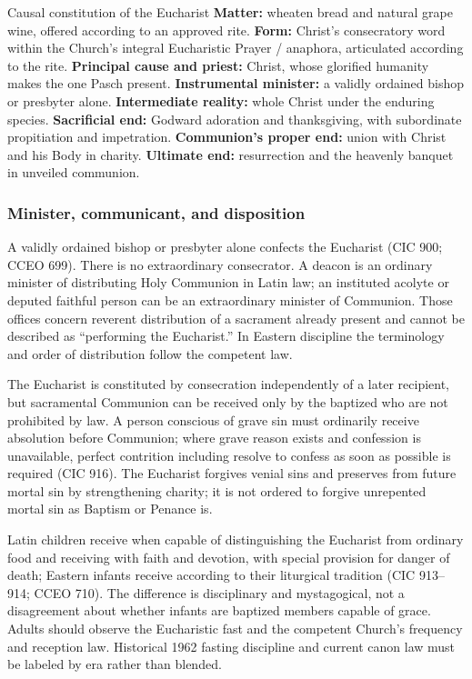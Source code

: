 \begin{massbox}{Causal constitution of the Eucharist}
\textbf{Matter:} wheaten bread and natural grape wine, offered according to an approved rite. \textbf{Form:} Christ's consecratory word within the Church's integral Eucharistic Prayer / anaphora, articulated according to the rite. \textbf{Principal cause and priest:} Christ, whose glorified humanity makes the one Pasch present. \textbf{Instrumental minister:} a validly ordained bishop or presbyter alone. \textbf{Intermediate reality:} whole Christ under the enduring species. \textbf{Sacrificial end:} Godward adoration and thanksgiving, with subordinate propitiation and impetration. \textbf{Communion's proper end:} union with Christ and his Body in charity. \textbf{Ultimate end:} resurrection and the heavenly banquet in unveiled communion.
\end{massbox}

\subsubsection{Minister, communicant, and disposition}

A validly ordained bishop or presbyter alone confects the Eucharist (CIC 900; CCEO 699). There is no extraordinary consecrator. A deacon is an ordinary minister of distributing Holy Communion in Latin law; an instituted acolyte or deputed faithful person can be an extraordinary minister of Communion. Those offices concern reverent distribution of a sacrament already present and cannot be described as ``performing the Eucharist.'' In Eastern discipline the terminology and order of distribution follow the competent law.

The Eucharist is constituted by consecration independently of a later recipient, but sacramental Communion can be received only by the baptized who are not prohibited by law. A person conscious of grave sin must ordinarily receive absolution before Communion; where grave reason exists and confession is unavailable, perfect contrition including resolve to confess as soon as possible is required (CIC 916). The Eucharist forgives venial sins and preserves from future mortal sin by strengthening charity; it is not ordered to forgive unrepented mortal sin as Baptism or Penance is.

Latin children receive when capable of distinguishing the Eucharist from ordinary food and receiving with faith and devotion, with special provision for danger of death; Eastern infants receive according to their liturgical tradition (CIC 913--914; CCEO 710). The difference is disciplinary and mystagogical, not a disagreement about whether infants are baptized members capable of grace. Adults should observe the Eucharistic fast and the competent Church's frequency and reception law. Historical 1962 fasting discipline and current canon law must be labeled by era rather than blended.

